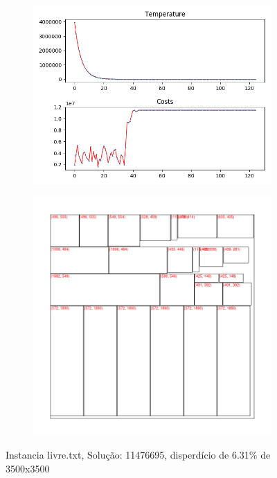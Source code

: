 \begin{figure}
\centering
\begin{subfigure}{.5\textwidth}
  \centering
  \includegraphics[width=1\linewidth]{results/livre/1/plot}
  \label{fig:sub1}
\end{subfigure}%
\begin{subfigure}{.5\textwidth}
  \centering
  \includegraphics[width=1\linewidth]{results/livre/1/cut}
  \label{fig:sub2}
\end{subfigure}
\caption{Instancia livre.txt, Solução: 11476695, disperdício de 6.31\% de 3500x3500}
\label{fig:test}
\end{figure}

